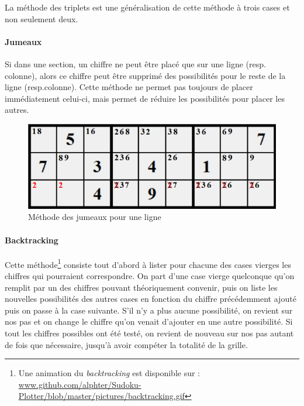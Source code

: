 \documentclass[12pt,a4paper]{report}
\begin{document}
La méthode des triplets est une généralisation de cette méthode à trois cases et non seulement deux.

\paragraph{Jumeaux} Si dans une section, un chiffre ne peut être placé que sur une ligne (resp. colonne), alors ce chiffre peut être supprimé des possibilités pour le reste de la ligne (resp.colonne). Cette méthode ne permet pas toujours de placer immédiatement celui-ci, mais permet de réduire les possibilités pour placer les autres.
\begin{figure}[!h]
 \center
 \includegraphics[scale=0.6]{../pictures/jumeaux}
 \caption{Méthode des jumeaux pour une ligne}
\end{figure}

\paragraph{Backtracking} Cette méthode\footnote{Une animation du \emph{backtracking} est disponible sur : \url{www.github.com/alphter/Sudoku-Plotter/blob/master/pictures/backtracking.gif}} consiste tout d'abord à lister pour chacune des cases vierges les chiffres qui pourraient correspondre. On part d'une case vierge quelconque qu'on remplit par un des chiffres pouvant théoriquement convenir, puis on liste les nouvelles possibilités des autres cases en fonction du chiffre précédemment ajouté puis on passe à la case suivante. S'il n'y a plus aucune possibilité, on revient sur nos pas et on change le chiffre qu'on venait d'ajouter en une autre possibilité. Si tout les chiffres possibles ont été testé, on revient de nouveau sur nos pas autant de fois que nécessaire, jusqu'à avoir compéter la totalité de la grille. 

\begin{center}
\end{center}
\end{document}
